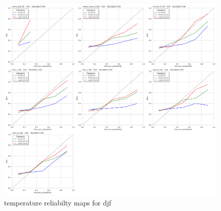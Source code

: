 \begin{figure}[H]
    \centering
    \includegraphics[width=1\linewidth]{plots/prob/rela/rela_diagram_t2m_djf.png}
    \caption{temperature reliabilty maps for djf}
    \label{CORR_mam_t2m.png}
\end{figure}

